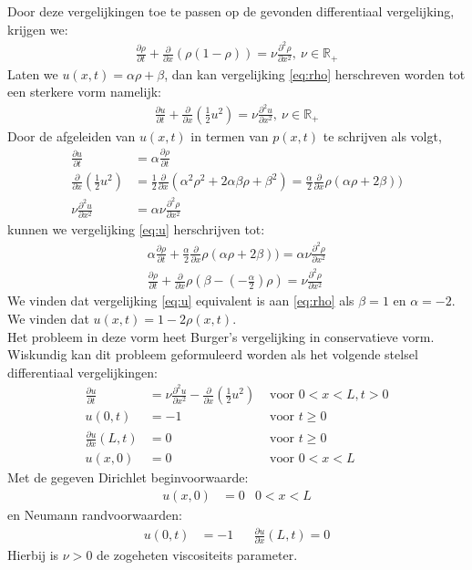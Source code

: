 \documentclass{article}
\begin{document}
Door deze vergelijkingen toe te passen op de gevonden differentiaal vergelijking, krijgen we:
\begin{align}
	\frac{\partial \rho}{\partial t}+\frac{\partial}{\partial x}(\rho(1-\rho))=\nu \frac{\partial^2 \rho}{\partial x^2},~\nu\in \mathbb{R}_+ \label{eq:rho}
	\end{align}
Laten we \(u(x,t)=\alpha\rho + \beta\), dan kan vergelijking \eqref{eq:rho} herschreven worden tot een sterkere vorm  namelijk:
	\begin{align}
 \frac{\partial u}{\partial t}+\frac{\partial}{\partial x}\left(\frac{1}{2}u^2\right) = \nu \frac{\partial^2 u}{\partial x^2},~\nu\in \mathbb{R}_+\label{eq:u}
\end{align}
Door de afgeleiden van \(u(x,t)\) in termen van \(p(x,t)\) te schrijven als volgt,
\begin{align*}
 \frac{\partial u}{\partial t} &=\alpha\frac{\partial \rho}{\partial t}\\
\frac{\partial}{\partial x}\left(\frac{1}{2}u^2\right)&=\frac{1}{2}\frac{\partial}{\partial x}(\alpha^2\rho^2 +2\alpha\beta\rho+\beta^2)= \frac{\alpha}{2}\frac{\partial}{\partial x}\rho(\alpha\rho+2\beta))\\
\nu \frac{\partial^2 u}{\partial x^2}&=\alpha \nu\frac{\partial^2 \rho}{\partial x^2}
\end{align*}
kunnen we vergelijking \eqref{eq:u} herschrijven tot:
\begin{align*}
	\alpha\frac{\partial \rho}{\partial t}+\frac{\alpha}{2}\frac{\partial}{\partial x}\rho(\alpha\rho+2\beta))=\alpha \nu\frac{\partial^2 \rho}{\partial x^2}\\
		\frac{\partial \rho}{\partial t}+\frac{\partial}{\partial x}\rho(\beta-(-\frac{\alpha}{2})\rho)=\nu\frac{\partial^2 \rho}{\partial x^2}
\end{align*}
We vinden dat vergelijking \eqref{eq:u} equivalent is aan \eqref{eq:rho} als \(\beta=1\) en \(\alpha=-2\). We vinden dat \(u(x,t)=1-2\rho(x,t)\).\\
Het probleem in deze vorm heet Burger's vergelijking in conservatieve vorm. \\
Wiskundig kan dit probleem geformuleerd worden als het volgende stelsel differentiaal vergelijkingen:
\begin{align}
\label{eq:dif}
\frac{\partial u}{\partial t} &= \nu \frac{\partial^2 u}{\partial x^2} -\frac{\partial}{\partial x}\left(\frac{1}{2}u^2\right) &\text{ voor } 0<x<L, t>0\\\label{eq:u0}
u(0,t) &= -1 &\text{ voor } t\geq 0\\
\frac{\partial u}{\partial x}(L,t) &= 0 &\text{ voor } t\geq 0\\
u(x,0) &= 0 &\text{ voor } 0<x<L
\end{align}
Met de gegeven Dirichlet beginvoorwaarde:
\begin{align*}
  u(x,0) &= 0 &0<x<L
\end{align*} 
en Neumann randvoorwaarden:
\begin{align*}
u(0,t) &= -1 &&
\frac{\partial u}{\partial x}(L,t) = 0 
\end{align*}
Hierbij is \(\nu>0\) de zogeheten viscositeits parameter.
\end{document}
